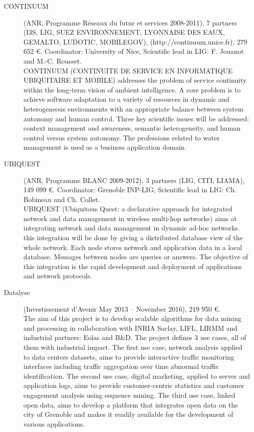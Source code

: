 \begin{description}
\item[CONTINUUM] (ANR, Programme R{\'e}seaux du futur et services 2008-2011),  7 partners (I3S, LIG, SUEZ ENVIRONNEMENT, LYONNAISE DES EAUX, GEMALTO, LUDOTIC, MOBILEGOV), (http://continuum.unice.fr), 279 652 \euro. Coordinator: University of Nice, Scientific lead in LIG: F. Jouanot and M.-C. Rousset. \\
CONTINUUM (CONTINUITE DE SERVICE EN INFORMATIQUE UBIQUITAIRE ET MOBILE) addresses the problem of service continuity within the long-term vision of ambient intelligence. A core problem is to achieve software adaptation to a variety of resources in dynamic and heterogeneous environments with an appropriate balance between system autonomy and human control. Three key scientific issues will be addressed: context management and awareness, semantic heterogeneity, and human control versus system autonomy. The professions related to water management is used as a business application domain.

\item[UBIQUEST] (ANR, Programme BLANC 2009-2012), 3 partners (LIG, CITI, LIAMA), 149 099 \euro. Coordinator: Grenoble INP-LIG, Scientific lead in LIG: Ch. Bobineau and Ch. Collet. \\
UBIQUEST (Ubiquitous Quest: a declarative approach for integrated network and data management in wireless multi-hop networks) aims at integrating network and data management in dynamic ad-hoc networks. this integration will be done by giving a distributed database view of the whole network. Each node stores network and application data in a local database. Messages between nodes are queries or answers. The objective of this integration is the rapid development and deployment of applications and network protocols.

\item[Datalyse] (Investissement d’Avenir May 2013 -- November 2016), 219 950 \euro. \\
The aim of this project is to develop scalable algorithms for data mining and processing in collaboration with INRIA Saclay, LIFL, LIRMM and industrial partners: Eolas and B\&D. The project defines 3 use cases, all of them with industrial impact. The first use case, network analysis applied to data centers datasets, aims to provide interactive traffic monitoring interfaces including traffic aggregation over time abnormal traffic identification. The second use case, digital marketing, applied to server and application logs, aims to provide customer-centric statistics and customer engagement analysis using sequence mining. The third use case, linked open data, aims to develop a platform that integrates open data on the city of Grenoble and makes it readily available for the development of various applications.


\end{description}
